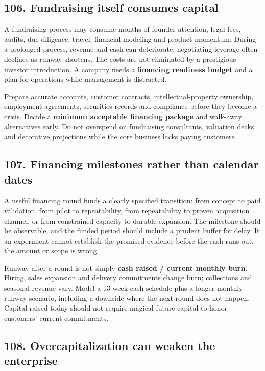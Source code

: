 \subsection{106. Fundraising itself consumes capital}


A fundraising process may consume months of founder attention, legal fees, audits, due diligence, travel, financial modeling and product momentum. During a prolonged process, revenue and cash can deteriorate; negotiating leverage often declines as runway shortens. The costs are not eliminated by a prestigious investor introduction. A company needs a \textbf{financing readiness budget} and a plan for operations while management is distracted.

Prepare accurate accounts, customer contracts, intellectual-property ownership, employment agreements, securities records and compliance before they become a crisis. Decide a \textbf{minimum acceptable financing package} and walk-away alternatives early. Do not overspend on fundraising consultants, valuation decks and decorative projections while the core business lacks paying customers.

\subsection{107. Financing milestones rather than calendar dates}


A useful financing round funds a clearly specified transition: from concept to paid validation, from pilot to repeatability, from repeatability to proven acquisition channel, or from constrained capacity to durable expansion. The milestone should be observable, and the funded period should include a prudent buffer for delay. If an experiment cannot establish the promised evidence before the cash runs out, the amount or scope is wrong.

Runway after a round is not simply \textbf{cash raised / current monthly burn}. Hiring, sales expansion and delivery commitments change burn; collections and seasonal revenue vary. Model a 13-week cash schedule plus a longer monthly runway scenario, including a downside where the next round does not happen. Capital raised today should not require magical future capital to honor customers' current commitments.

\subsection{108. Overcapitalization can weaken the enterprise}


